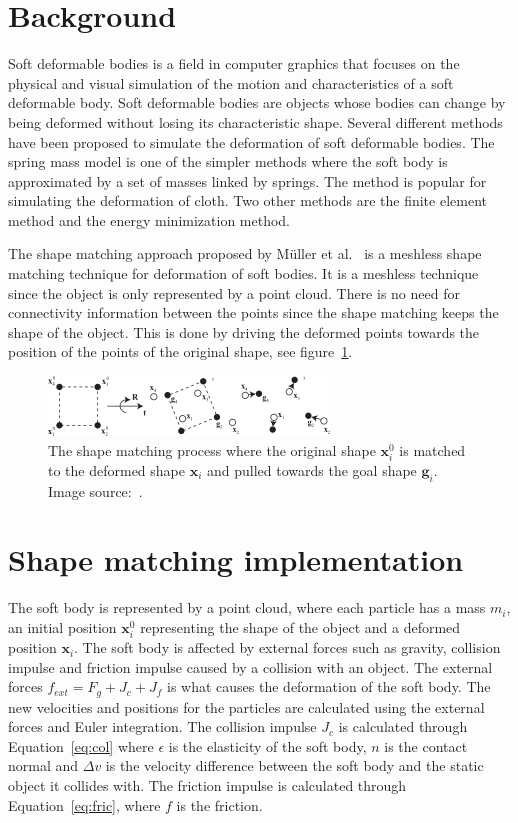 \section{Background}
    Soft deformable bodies is a field in computer graphics that focuses on the physical and visual simulation of the motion and characteristics of a soft deformable body.
    Soft deformable bodies are objects whose bodies can change by being deformed without losing its characteristic shape.
    Several different methods have been proposed to simulate the deformation of soft deformable bodies.
    The spring mass model is one of the simpler methods where the soft body is approximated by a set of masses linked by springs.
    The method is popular for simulating the deformation of cloth.
    Two other methods are the finite element method and the energy minimization method.

    The shape matching approach proposed by M\"uller et al.~\cite{shapematching} is a meshless shape matching technique for deformation of soft bodies.
    It is a meshless technique since the object is only represented by a point cloud.
    There is no need for connectivity information between the points since the shape matching keeps the shape of the object.
    This is done by driving the deformed points towards the position of the points of the original shape, see figure~\ref{fig:def}.
    
    \begin{figure}
    \includegraphics[width=\linewidth]{img/deformation2.png}
    \caption{The shape matching process where the original shape $\mathbf{x}^0_i$ is matched to the deformed shape $\mathbf{x}_i$ and pulled towards the goal shape $\mathbf{g}_i$. Image source:~\cite{shapematching}.}
    \label{fig:def}
    \end{figure}
    
\section{Shape matching implementation}
    The soft body is represented by a point cloud, where each particle has a mass $m_i$, an initial position $\mathbf{x}_i^0$ representing the shape of the object and a deformed position $\mathbf{x}_i$.
    The soft body is affected by external forces such as gravity, collision impulse and friction impulse caused by a collision with an object.
    The external forces $f_{ext} = F_g + J_c + J_f$ is what causes the deformation of the soft body.
    The new velocities and positions for the particles are calculated using the external forces and Euler integration.
    The collision impulse $J_c$ is calculated through Equation~\ref{eq:col} where $\epsilon$ is the elasticity of the soft body, $n$ is the contact normal and $\Delta{v}$ is the velocity difference between the soft body and the static object it collides with.
    The friction impulse is calculated through Equation~\ref{eq:fric}, where $f$ is the friction.

